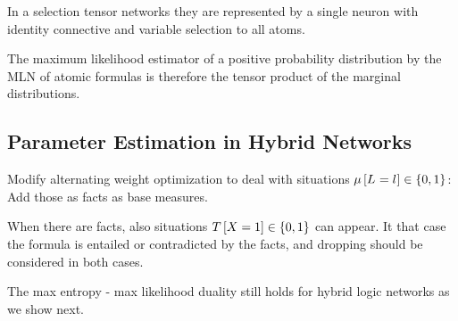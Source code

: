 In a selection tensor networks they are represented by a single neuron with identity connective and variable selection to all atoms.
	
The maximum likelihood estimator of a positive probability distribution by the MLN of atomic formulas is therefore the tensor product of the marginal distributions.


\begin{remark}
\end{remark}


\subsection{Parameter Estimation in Hybrid Networks}



Modify alternating weight optimization to deal with situations $\mu\left[L_{}=l_{}\right]\in\{0,1\}$: Add those as facts as base measures.

When there are facts, also situations $T\left[X=1\right]\in\{0,1\}$ can appear.
It that case the formula is entailed or contradicted by the facts, and dropping should be considered in both cases.

The max entropy - max likelihood duality still holds for hybrid logic networks as we show next.

